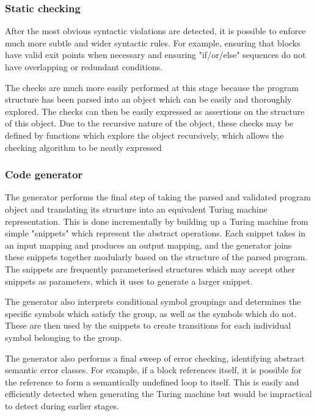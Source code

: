 \documentclass[11pt]{article}
\begin{document}
\subsubsection{Static checking}

After the most obvious syntactic violations are detected, it is possible to enforce much more subtle and wider syntactic rules. For example, ensuring that blocks have valid exit points when necessary and ensuring "if/or/else" sequences do not have overlapping or redundant conditions.

The checks are much more easily performed at this stage because the program structure has been parsed into an object which can be easily and thoroughly explored. The checks can then be easily expressed as assertions on the structure of this object. Due to the recursive nature of the object, these checks may be defined by functions which explore the object recursively, which allows the checking algorithm to be neatly expressed

\subsubsection{Code generator}

The generator performs the final step of taking the parsed and validated program object and translating its structure into an equivalent Turing machine representation. This is done incrementally by building up a Turing machine from simple "snippets" which represent the abstract operations. Each snippet takes in an input mapping and produces an output mapping, and the generator joins these snippets together modularly based on the structure of the parsed program. The snippets are frequently parameterised structures which may accept other snippets as parameters, which it uses to generate a larger snippet.

The generator also interprets conditional symbol groupings and determines the specific symbols which satisfy the group, as well as the symbols which do not. These are then used by the snippets to create transitions for each individual symbol belonging to the group.

The generator also performs a final sweep of error checking, identifying abstract semantic error classes. For example, if a block references itself, it is possible for the reference to form a semantically undefined loop to itself. This is easily and efficiently detected when generating the Turing machine but would be impractical to detect during earlier stages.
\end{document}
